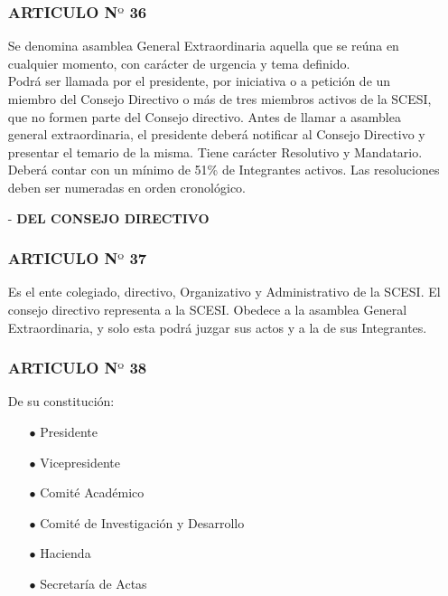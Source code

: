 \documentclass[letterpaper,11pt]{book}
\begin{document}
\begin{itemize}
\subsubsection*{ARTICULO N$º$ 36}
Se denomina asamblea General Extraordinaria aquella que se reúna en cualquier momento, con carácter de urgencia y tema definido.\\
Podrá ser llamada por el presidente, por iniciativa o a petición de un miembro del Consejo Directivo o más de tres miembros activos de la SCESI, que no formen parte del Consejo directivo. Antes de llamar a asamblea general extraordinaria, el presidente deberá notificar al Consejo Directivo y presentar el temario de la misma. Tiene carácter Resolutivo y Mandatario. Deberá contar con un mínimo de 51\% de Integrantes activos. Las resoluciones deben ser numeradas en orden cronológico. 
\item[-] {\bf DEL CONSEJO DIRECTIVO}
\subsubsection*{ARTICULO N$º$ 37}
Es el ente colegiado, directivo, Organizativo y Administrativo de la SCESI. El consejo directivo representa a la SCESI. Obedece a la asamblea General Extraordinaria, y solo esta podrá juzgar sus actos y a la de sus Integrantes.

\subsubsection*{ARTICULO N$º$ 38}
De su constitución: 
\begin{itemize}
\item[$\bullet$] Presidente 
\item[$\bullet$] Vicepresidente 
\item[$\bullet$] Comité Académico 
\item[$\bullet$] Comité de Investigación y Desarrollo 
\item[$\bullet$] Hacienda 
\item[$\bullet$] Secretaría de Actas
\end{itemize}

\end{itemize}
\end{document}
